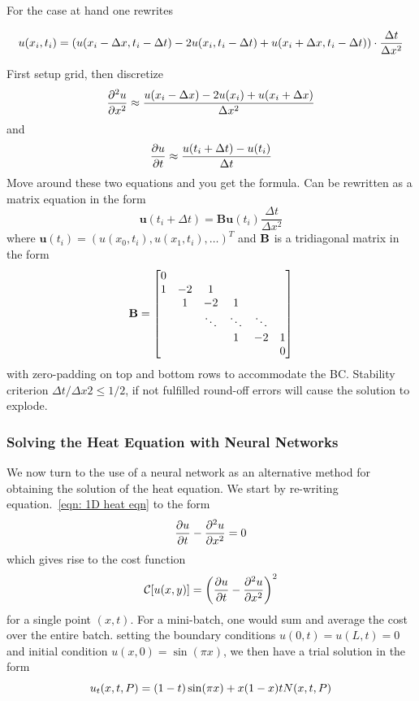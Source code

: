 \documentclass[reprint, english, nofootinbib]{revtex4-2}
\begin{document}
For the case at hand one rewrites 
\begin{widetext}
\begin{equation}
    u(x_i,t_i) = \qty(u(x_i - \Delta x,t_i - \Delta t) - 
                 2u(x_i,t_i-\Delta t) + 
                 u(x_i+\Delta x,t_i-\Delta t)) \cdot \frac{\Delta t}{\Delta x^2} 
\end{equation}
\end{widetext}
First setup grid, then discretize 
\begin{equation}
   \pdv[2]{u}{x} \approx \frac{u(x_i-\Delta x)-2u(x_i) + u(x_i+\Delta x)}{\Delta x^2} 
\end{equation}
and
\begin{equation}
    \pdv{u}{t} \approx \frac{u(t_i + \Delta t) - u(t_{i})}{\Delta t}
\end{equation}
Move around these two equations and you get the formula. Can be rewritten as a matrix equation in the form
\begin{equation}
    \pmb u(t_i+\Delta t) = \mathbf{B} \pmb u(t_i) \frac{\Delta t}{\Delta x^2}
\end{equation}
where $\pmb u(t_i) = (u(x_0, t_i), u(x_1, t_i), \dots)^T$ and $\bf B$ is a tridiagonal matrix in the form
\begin{equation} \label{eqn: Az = b}
    \mathbf B = \qty[
    \begin{matrix}
    0 \\
    1 & -2 & 1 \\
    & 1 & -2 & 1 \\
    && \ddots & \ddots & \ddots \\
    &&& 1 & -2 & 1 \\
    &&&&& 0
    \end{matrix}
    ]
 \end{equation}
with zero-padding on top and bottom rows to accommodate the BC. Stability criterion $\Delta t/\Delta x2 \leq 1/2$, if not fulfilled round-off errors will cause the solution to explode. 

\subsubsection{Solving the Heat Equation with Neural Networks}
\noindent
We now turn to the use of a neural network as an alternative method for obtaining the solution of the heat equation. We start by re-writing equation.~\ref{eqn: 1D heat eqn} to the form
\begin{equation}
    \pdv{u}{t} - \pdv[2]{u}{x} = 0
\end{equation}
which gives rise to the cost function 
\begin{equation}
    \mathcal C\qty[u\qty(x, y)] = \qty(\pdv{u}{t} - \pdv[2]{u}{x})^2
\end{equation}
for a single point $(x,t)$. For a mini-batch, one would sum and average the cost over the entire batch.
setting the boundary conditions $u(0, t) = u(L, t) = 0$ and initial condition $u(x, 0) = \sin(\pi x)$, we then have a trial solution in the form
\begin{equation}
    u_t(x, t, P) = \qty(1 - t)\sin(\pi x) + x(1 - x)t N(x, t, P)
\end{equation}
\end{document}
